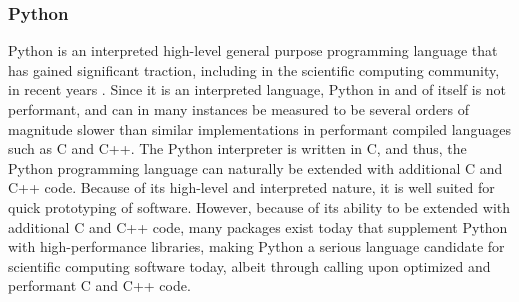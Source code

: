 \subsubsection{Python} \label{background:implementation_tools_and_libraries:python}
Python is an interpreted high-level general purpose programming language that has gained significant traction, including in the scientific computing community, in recent years \cite{python,python_popular}.
Since it is an interpreted language, Python in and of itself is not performant, and can in many instances be measured to be several orders of magnitude slower than similar implementations in performant compiled languages such as C and C++.
The Python interpreter is written in C, and thus, the Python programming language can naturally be extended with additional C and C++ code.
Because of its high-level and interpreted nature, it is well suited for quick prototyping of software.
However, because of its ability to be extended with additional C and C++ code, many packages exist today that supplement Python with high-performance libraries, making Python a serious language candidate for scientific computing software today, albeit through calling upon optimized and performant C and C++ code.
